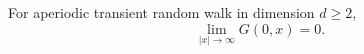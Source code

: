 For aperiodic transient random walk in dimension \(d \geq 2\),
\[
\lim_{|x| \to \infty} G(0,x) = 0.
\]

